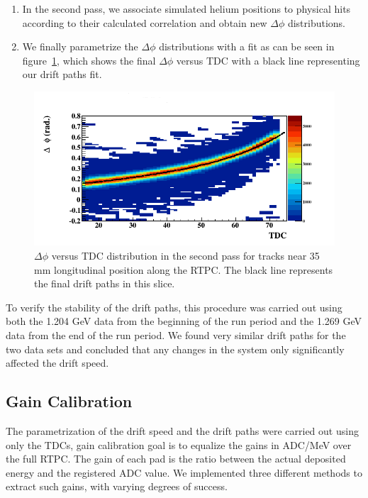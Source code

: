 \documentclass[twocolumn,showpacs,superscriptaddress,groupedaddress]{revtex4}
\begin{document}
\begin{enumerate}
   \item In the second pass, we associate simulated helium positions to 
      physical hits according to their calculated correlation and obtain new 
      $\Delta \phi$ distributions.

   \item We finally parametrize the $\Delta\phi$ distributions with a fit as 
      can be seen in figure~\ref{fig:DELTA_PHI_TDC}, which shows the final 
      $\Delta \phi$ versus TDC with a black line representing our drift paths 
      fit.
\end{enumerate}


\begin{figure}[tb]
\centering
\includegraphics[scale=0.37]{fig/FitResult_p2_10.png}
\caption{$\Delta \phi$ versus TDC distribution in the second pass for tracks
near 35 mm longitudinal position along the RTPC. The black line represents 
the final drift paths in this slice.}
\label{fig:DELTA_PHI_TDC}
\end{figure}

To verify the stability of the drift paths, this procedure was carried out 
using both the 1.204 GeV data from the beginning of the run period and the 
1.269 GeV data from the end of the run period. We found very similar drift paths
for the two data sets and concluded that any changes in the system only
significantly affected the drift speed.

\subsection{Gain Calibration}

The parametrization of the drift speed and the drift paths were carried out 
using only the TDCs, gain calibration goal is to equalize the gains in ADC/MeV 
over the full RTPC. The gain of each pad is the ratio between the actual 
deposited energy and the registered ADC value. We implemented three different 
methods to extract such gains, with varying degrees of success.
\end{document}
